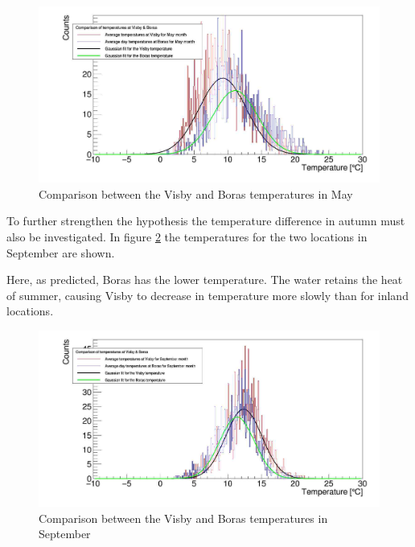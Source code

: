 \begin{figure}
	\centering
	\includegraphics[width=14cm]{VisbyMay.jpg}
	\caption{Comparison between the Visby and Boras temperatures in May}
	\label{May}
\end{figure}

To further strengthen the hypothesis the temperature difference in autumn must also be investigated. In figure \ref{Sept} the temperatures for the two locations in September are shown.

Here, as predicted, Boras has the lower temperature. The water retains the heat of summer, causing Visby to decrease in temperature more slowly than for inland locations.  

\begin{figure}
	\centering
	\includegraphics[width=14cm]{VisbySeptember.jpg}
	\caption{Comparison between the Visby and Boras temperatures in September}
	\label{Sept}
\end{figure}
